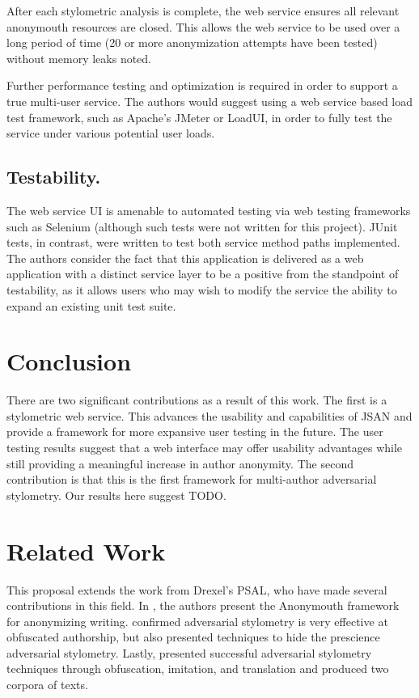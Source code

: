 \documentclass[letterpaper]{article}
\begin{document}
After each stylometric analysis is complete, the web service ensures
all relevant anonymouth resources are closed. This allows the web
service to be used over a long period of time (20 or more
anonymization attempts have been tested) without memory leaks noted.

Further performance testing and optimization is required in order to support a true
multi-user service. The authors would suggest using a web service
based load test framework, such as Apache's JMeter or LoadUI, in order
to fully test the service under various potential user loads.

\subsection{Testability.}

The web service UI is amenable to automated testing via web testing
frameworks such as Selenium (although such tests were not written for
this project). JUnit tests, in contrast, were written to test both
service method paths implemented. The authors consider the fact that
this application is delivered as a web application with a distinct
service layer to be a positive from the standpoint of testability, as
it allows users who may wish to modify the service the ability to
expand an existing unit test suite.

\section{Conclusion}

There are two significant contributions as a result of this work.  The
first is a stylometric web service.  This advances the usability
and capabilities of JSAN and provide a framework for more expansive
user testing in the future. The user testing results suggest that a
web interface may offer usability advantages while still providing a
meaningful increase in author anonymity.  The second contribution is that this is
the first framework for multi-author adversarial stylometry.  Our
results here suggest TODO.

\section*{Related Work}\label{sec:related}
This proposal extends the work from Drexel's PSAL, who have made
several contributions in this field.  In
\cite{conf/pet/McDonaldACSG12}, the authors present the Anonymouth
framework for anonymizing writing.
\cite{Afroz:2012:DHF:2310656.2310711} confirmed adversarial stylometry
is very effective at obfuscated authorship, but also presented
techniques to hide the prescience adversarial stylometry.  Lastly,
\cite{journals/tissec/BrennanAG12} presented successful adversarial
stylometry techniques through obfuscation, imitation, and translation
and produced two corpora of texts.
\end{document}
